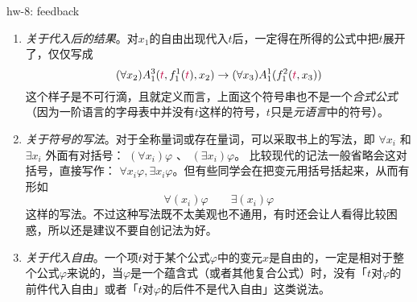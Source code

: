 \documentclass[UTF8,12pt,a4paper]{ctexart}
\begin{document}
\vspace{1em}
\dotfill hw-8: feedback
\dotfill
\begin{enumerate}
	\item \textit{关于代入后的结果}。对$x_1$的自由出现代入$t$后，一定得在所得的公式中把$t$展开了，仅仅写成
	\[
	(\forall x_2) A^3_1 ({\color{purple} t}, f^1_1({\color{purple} t}),x_2)  \to (\forall x_3)A^1_1(f^2_1({\color{purple} t},x_3))
	\]
	这个样子是不可行滴，且就定义而言，上面这个符号串也不是一个\textit{合式公式}（因为一阶语言的字母表中并没有$t$这样的符号，$t$只是\textit{元语言}中的符号）。
	
	\item \textit{关于符号的写法}。对于全称量词或存在量词，可以采取书上的写法，即 $\forall x_i$ 和 $\exists x_i$ 外面有对括号：
	$ (\forall x_i) \varphi$ 、 $(\exists x_i) \varphi$。
	比较现代的记法一般省略会这对括号，直接写作： $\forall x_i \varphi, \exists x_i \varphi $。但有些同学会在把变元用括号括起来，从而有形如
	\[
	\forall (x_i) \varphi \qquad \exists (x_i) \varphi
	\]
	这样的写法。不过这种写法既不太美观也不通用，有时还会让人看得比较困惑，所以还是建议不要自创记法为好。
	
	\item \textit{关于代入自由}。一个项$t$对于某个公式$\varphi$中的变元$x$是自由的，一定是相对于整个公式$\varphi$来说的，当$\varphi$是一个蕴含式（或者其他复合公式）时，没有「$t$对$\varphi$的前件代入自由」或者「$t$对$\varphi$的后件不是代入自由」这类说法。
\end{enumerate}
\end{document}
